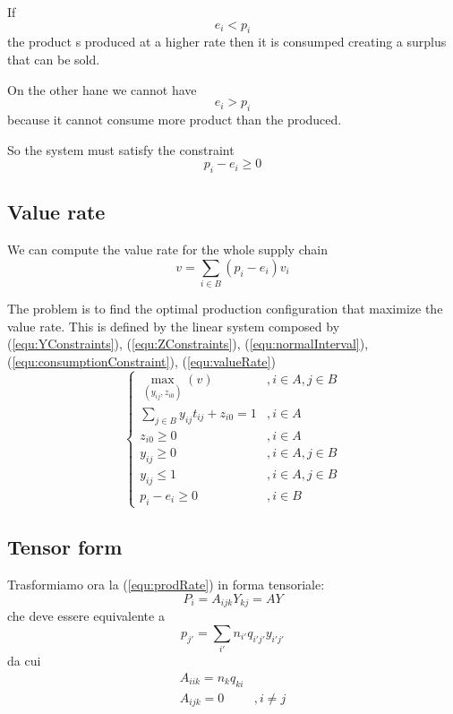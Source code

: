 \documentclass[a4paper,11pt]{article}
\begin{document}
If
	\[ e_i < p_i \]
the product s produced at a higher rate then it is consumped creating a surplus that can be sold.

On the other hane we cannot have 
	\[ e_i > p_i \]
because it cannot consume more product than the produced.

So the system must satisfy the constraint
\begin{equation}
\label{equ:consumptionConstraint}
	p_i - e_i \ge 0
\end{equation}
	
\subsection{Value rate}
We can compute the value rate for the whole supply chain
\begin{equation}
\label{equ:valueRate}
	v = \sum_{i \in B}( p_i - e_i ) v_i
\end{equation}

The problem is to find the optimal production configuration that maximize the value rate. This is defined by the linear system composed by
(\ref{equ:YConstraints}),
(\ref{equ:ZConstraints}),
(\ref{equ:normalInterval}),
(\ref{equ:consumptionConstraint}),
(\ref{equ:valueRate})
\[
\left\{
\begin{array}{ll}
	\max_{(y_{ij}, z_{i0})} (v) & , i \in A, j \in B \\
	\sum_{j \in B} y_{ij} t_{ij} + z_{i0} = 1 & , i \in A \\
	z_{i0} \ge 0 & , i \in A \\
	y_{ij} \ge 0 & , i \in A, j \in B \\
	y_{ij} \le 1 & , i \in A, j \in B \\
	p_i - e_i \ge 0 & , i \in B
\end{array}
\right.
\]

\subsection{Tensor form}

Trasformiamo ora la (\ref{equ:prodRate}) in forma tensoriale:
\[
	P_i = A_{ijk} Y_{kj} = A Y
\]
che deve essere equivalente a
\begin{equation}
\label{equ:p_j}
	p_{j'} = \sum_{i'} n_{i'} q_{i'j'} y_{i'j'}
\end{equation}
da cui
\begin{equation}
\label{equ:Aijk}
\begin{array}{ll}
	A_{iik} = n_k q_{ki} \\
	A_{ijk} = 0 &, i \ne j
\end{array}
\end{equation}
\end{document}
